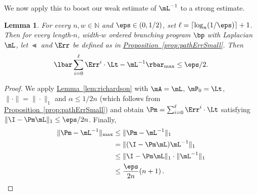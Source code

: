 \documentclass[11pt]{article}
\newcommand{\expref}[2]{\texorpdfstring{\hyperref[#2]{#1~\ref{#2}}}{#1~\ref{#2}}}
\newtheorem{lemma}[theorem]{Lemma}
\newcommand{\N}{{\mathbb N}}
\begin{document}
We now apply this to boost our weak estimate of $\mL^{-1}$ to a strong estimate.
\begin{lemma}
\label{lem:pathStrongErr}
For every $n,w\in \N$ and $\eps \in (0,1/2)$, set $\ell=\lceil \log_{n}(1/\eps)\rceil+1$. Then for every length-$n$, width-$w$ ordered branching program $\bp$ with Laplacian $\mL$, let $\Lt$ and $\Err$ be defined as in \expref{Proposition}{prop:pathErrSmall}. Then
$$\lbar\sum_{i=0}^{\ell}\Err^i\cdot \Lt-\mL^{-1}\rbar_{\max}\leq \eps/2.$$
\end{lemma}
\begin{proof}
We apply \expref{Lemma}{lem:richardson} with $\mA=\mL$, $\mP_0=\Lt$, $\|\cdot\|=\|\cdot\|_1$ and $\alpha\leq 1/2n$ (which follows from \expref{Proposition}{prop:pathErrSmall}) and obtain $\Pm=\sum_{i=0}^{\ell}\Err^i\cdot \Lt$ satisfying $\|\I-\Pm\mL\|_1\leq \eps/2n$. Finally,
\begin{align*}
    \|\Pm-\mL^{-1}\|_{\max} &\leq \|\Pm-\mL^{-1}\|_1\\ 
    &= \|(\I-\Pm \mL)\mL^{-1}\|_1\\
    &\leq \|\I-\Pm\mL\|_1\cdot \|\mL^{-1}\|_1\\
    &\leq \frac{\eps}{2n}(n+1)\,. \qedhere
\end{align*}
\end{proof}
\end{document}

